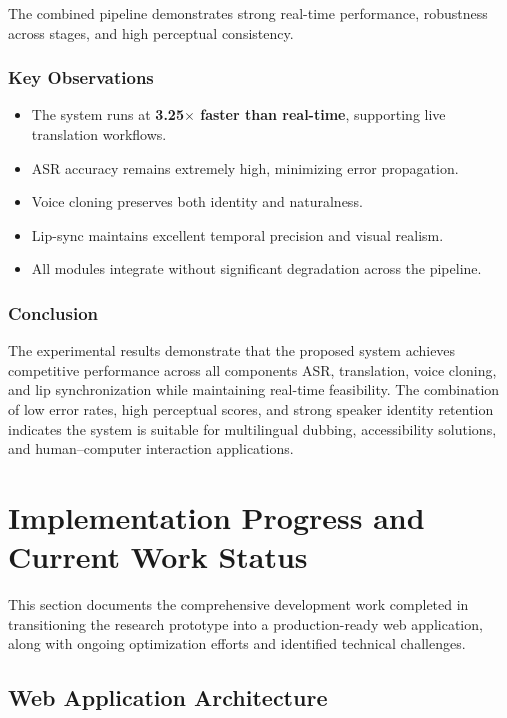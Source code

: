 \documentclass[12pt,oneside]{report}
\begin{document}
The combined pipeline demonstrates strong real-time performance, robustness across stages, and high perceptual consistency.

\subsubsection*{Key Observations}

\begin{itemize}
    \item The system runs at \textbf{3.25$\times$ faster than real-time}, supporting live translation workflows.
    \item ASR accuracy remains extremely high, minimizing error propagation.
    \item Voice cloning preserves both identity and naturalness.
    \item Lip-sync maintains excellent temporal precision and visual realism.
    \item All modules integrate without significant degradation across the pipeline.
\end{itemize}

\subsubsection*{Conclusion}

The experimental results demonstrate that the proposed system achieves competitive performance across all components ASR, translation, voice cloning, and lip synchronization while maintaining real-time feasibility. The combination of low error rates, high perceptual scores, and strong speaker identity retention indicates the system is suitable for multilingual dubbing, accessibility solutions, and human–computer interaction applications.


\section{Implementation Progress and Current Work Status}

This section documents the comprehensive development work completed in transitioning the research prototype into a production-ready web application, along with ongoing optimization efforts and identified technical challenges.

\subsection{Web Application Architecture}
\end{document}
